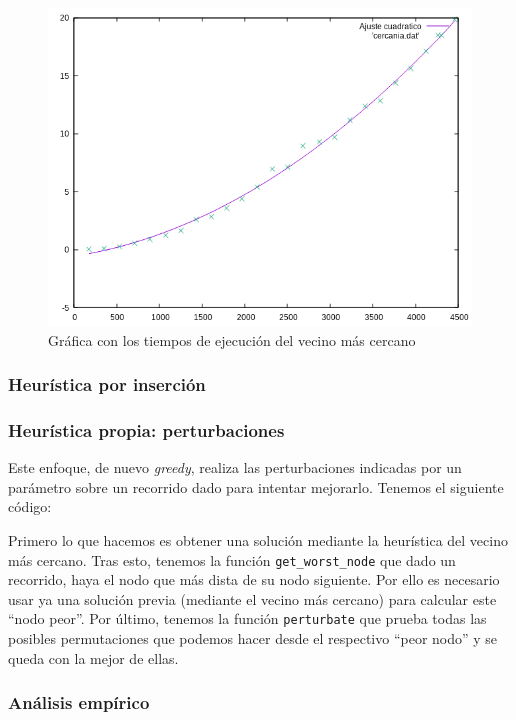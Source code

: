 \documentclass[10pt,a4paper]{article}
\begin{document}
 \begin{figure}[h!]
 	\centering
 	\includegraphics[scale=0.55]{./Images/cercania.png}
 	\caption{Gráfica con los tiempos de ejecución del vecino más cercano}
 \end{figure}

\subsubsection{Heurística por inserción}

\subsubsection{Heurística propia: perturbaciones}

Este enfoque, de nuevo \textit{greedy}, realiza las perturbaciones indicadas por un parámetro sobre un recorrido dado para intentar mejorarlo. Tenemos el siguiente código:


Primero lo que hacemos es obtener una solución mediante la heurística del vecino más cercano. Tras esto, tenemos la función \texttt{get\_worst\_node} que dado un recorrido, haya el nodo que más dista de su nodo siguiente. Por ello es necesario usar ya una solución previa (mediante el vecino más cercano) para calcular este ``nodo peor''. Por último, tenemos la función \texttt{perturbate} que prueba todas las posibles permutaciones que podemos hacer desde el respectivo ``peor nodo'' y se queda con la mejor de ellas.

\subsubsection*{Análisis empírico}
\end{document}
